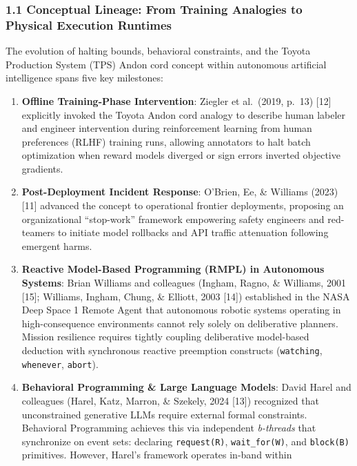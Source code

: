 \documentclass[
  10pt,letterpaper]{article}
\providecommand{\tightlist}{%
  \setlength{\itemsep}{0pt}\setlength{\parskip}{0pt}}
\begin{document}
\subsubsection{1.1 Conceptual Lineage: From Training Analogies to
Physical Execution
Runtimes}\label{conceptual-lineage-from-training-analogies-to-physical-execution-runtimes}

The evolution of halting bounds, behavioral constraints, and the Toyota
Production System (TPS) Andon cord concept within autonomous artificial
intelligence spans five key milestones:

\begin{enumerate}
\def\labelenumi{\arabic{enumi}.}
\tightlist
\item
  \textbf{Offline Training-Phase Intervention}: Ziegler et al.~(2019,
  p.~13) {[}12{]} explicitly invoked the Toyota Andon cord analogy to
  describe human labeler and engineer intervention during reinforcement
  learning from human preferences (RLHF) training runs, allowing
  annotators to halt batch optimization when reward models diverged or
  sign errors inverted objective gradients.
\item
  \textbf{Post-Deployment Incident Response}: O'Brien, Ee, \& Williams
  (2023) {[}11{]} advanced the concept to operational frontier
  deployments, proposing an organizational ``stop-work'' framework
  empowering safety engineers and red-teamers to initiate model
  rollbacks and API traffic attenuation following emergent harms.
\item
  \textbf{Reactive Model-Based Programming (RMPL) in Autonomous
  Systems}: Brian Williams and colleagues (Ingham, Ragno, \& Williams,
  2001 {[}15{]}; Williams, Ingham, Chung, \& Elliott, 2003 {[}14{]})
  established in the NASA Deep Space 1 Remote Agent that autonomous
  robotic systems operating in high-consequence environments cannot rely
  solely on deliberative planners. Mission resilience requires tightly
  coupling deliberative model-based deduction with synchronous reactive
  preemption constructs (\texttt{watching}, \texttt{whenever},
  \texttt{abort}).
\item
  \textbf{Behavioral Programming \& Large Language Models}: David Harel
  and colleagues (Harel, Katz, Marron, \& Szekely, 2024 {[}13{]})
  recognized that unconstrained generative LLMs require external formal
  constraints. Behavioral Programming achieves this via independent
  \emph{b-threads} that synchronize on event sets: declaring
  \texttt{request(R)}, \texttt{wait\_for(W)}, and \texttt{block(B)}
  primitives. However, Harel's framework operates in-band within

\end{enumerate}
\end{document}
